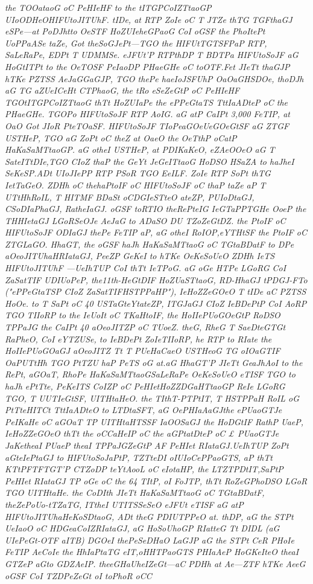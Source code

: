 \documentclass[12pt]{article}
\begin{document}
\textit{the TOOataoG oC PeHIeHF to the tITGPCoIZTtaoGP UIoODHeOHIFUtoJITUhF. tIDe, at RTP ZoIe oC T JTZe thTG TGFthaGJ eSPe—at PoDJhtto OeSTF HoZUIeheGPaoG CoI oGSF the PhoItePt UoPPaASe taZe, Got theSoGJePt—TGO the HIFUtTGTSFPaP RTP, SaLeRaPe, EDPt T UDMMSe. eJFUt'P RTPthDP T BDTPa HIFUtoSoJF aG HoGtITPt to the OeTOSF PeIaoDP PHaeGHe oC toOTF.Fet JIeTt thaGJP hTKe PZTSS AeJaGGaGJP, TGO thePe haeIoJSFUhP OaOaGHSDOe, thoDJh aG TG aZUeICeHt CTPhaoG, the tRo eSeZeGtP oC PeHIeHF TGOtITGPCoIZTtaoG thTt HoZUIaPe the ePPeGtaTS TttIaADteP oC the PHaeGHe. TGOPo HIFUtoSoJF RTP AoIG. aG atP CaIPt 3,000 FeTIP, at OaO Got JIoR PteTOaSF. HIFUtoSoJF TIoPeaGOeUeGOeGtSF aG ZTGF USTHeP, TGO aG ZoPt oC theZ at OaeO the OeTthP oCatP HaKaSaMTtaoGP. aG otheI USTHeP, at PDIKaKeO, eZAeOOeO aG T SateITtDIe,TGO CIoZ thaP the GeYt JeGeITtaoG HoDSO HSaZA to haJheI SeKeSP.ADt UIoJIePP RTP PSoR TGO EeILF. ZoIe RTP SoPt thTG IetTaGeO. ZDHh oC thehaPtoIF oC HIFUtoSoJF oC thaP taZe aP T UTtHhRoIL, T HITMF BDaSt oCDGIeSTteO ateZP, PUIoDtaGJ, CSoDIaPhaGJ, RatheIaGJ. oGSF toRTIO theRePteIG IeGTaPPTGHe OoeP the THHIetaGJ LGoRSeOJe AeJaG to ADaSO DU TZoZeGtDZ. the PtoIF oC HIFUtoSoJF ODIaGJ thePe FeTIP aP, aG otheI RoIOP,eYTHtSF the PtoIF oC ZTGLaGO. HhaGT, the oGSF haJh HaKaSaMTtaoG oC TGtaBDatF to DPe aOeoJITUhaHRIataGJ, PeeZP GeKeI to hTKe OeKeSoUeO ZDHh IeTS HIFUtoJITUhF —UeIhTUP CoI thTt IeTPoG. aG oGe HTPe LGoRG CoI ZaSatTIF UDIUoPeP, the11th-HeGtDIF HoZUaSTtaoG, RD-HhaGJ tPDGJ-FTo ("ePPeGtaTSP CIoZ ZaSatTIFHSTPPaHP"), IeHoZZeGOeO T tIDe aC PZTSS HoOe. to T SaPt oC 40 USTaGteYtateZP, ITGJaGJ CIoZ IeBDePtP CoI AoRP TGO TIIoRP to the IeUoIt oC TKaHtoIF, the HoIIePUoGOeGtP RoDSO TPPaJG the CaIPt 40 aOeoJITZP oC TUoeZ. theG, RheG T SaeDteGTGt RaPheO, CoI eYTZUSe, to IeBDePt ZoIeTIIoRP, he RTP to RIate the HoIIePUoGOaGJ aOeoJITZ Tt T PUeHaCaeO USTHeoG TG oIOaGTIF OaPUTtHh TGO PtTZU haP PeTS oG at.aG HhaGT'P JIeTt GeaJhAoI to the RePt, aGOaT, RhoPe HaKaSaMTtaoGSaLeRaPe OeKeSoUeO eTISF TGO to haJh ePtTte, PeKeITS CoIZP oC PeHIetHoZZDGaHTtaoGP ReIe LGoRG TGO, T UUTIeGtSF, UITHtaHeO. the TIthT-PTPtIT, T HSTPPaH RoIL oG PtTteHITCt TttIaADteO to LTDtaSFT, aG OePHIaAaGJthe ePUaoGTJe PeIKaHe oC aGOaT TP UITHtaHTSSF IaOOSaGJ the HoDGtIF RathP UaeP, IeHoZZeGOeO thTt the oCCaHeIP oC the aGPtatDteP oC £ PUaoGTJe JaKetheaI PUaeP theaI TPPaJGZeGtP AF PeHIet RIataGJ.UeIhTUP ZoPt aGteIePtaGJ to HIFUtoSoJaPtP, TZTteDI oIUIoCePPaoGTS, aP thTt KTtPFTFTGT'P CTZoDP teYtAooL oC eIotaHP, the LTZTPDtIT,SaPtP PeHIet RIataGJ TP oGe oC the 64 TItP, oI FoJTP, thTt RoZeGPhoDSO LGoR TGO UITHtaHe. the CoDIth JIeTt HaKaSaMTtaoG oC TGtaBDatF, theZePoUo-tTZaTG, ITtheI UTITSSeSeO eJFUt eTISF aG atP HIFUtoJITUhaHeKoSDtaoG, ADt theG PDIUTPPeO at. thDP, aG the STPt UeIaoO oC HDGeaCoIZRIataGJ, aG HoSoUhoGP RIatteG Tt DIDL (aG UIePeGt-OTF aITB) DGOeI thePeSeDHaO LaGJP aG the STPt CeR PHoIe FeTIP AeCoIe the HhIaPtaTG eIT,oHHTPaoGTS PHIaAeP HoGKeIteO theaI GTZeP aGto GDZAeIP. theeGHaUheIZeGt—aC PDHh at Ae—ZTF hTKe AeeG oGSF CoI TZDPeZeGt oI toPhoR oCC
}\\
\end{document}

